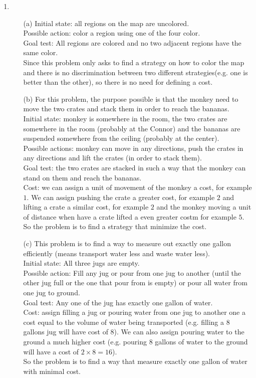 \documentclass[12pt]{article}
\begin{document}
\begin{singlespace}
\begin{enumerate}
\item
	\begin{itemize}
	\item[(a)] Initial state: all regions on the map are uncolored.\\
	Possible action: color a region using one of the four color.\\
	Goal test: All regions are colored and no two adjacent regions have the same color.\\
	Since this problem only asks to find a strategy on how to color the map and there is no discrimination between two different strategies(e.g. one is better than the other), so there is no need for defining a cost.\\
	\item[(b)] For this problem, the purpose possible is that the monkey need to move the two crates and stack them in order to reach the bananas.\\
	Initial state: monkey is somewhere in the room, the two crates are somewhere in the room (probably at the Connor) and the bananas are suspended somewhere from the ceiling (probably at the center).\\
	Possible actions: monkey can move in any directions, push the crates in any directions and lift the crates (in order to stack them).\\
	Goal test: the two crates are stacked in such a way that the monkey can stand on them and reach the bananas.\\
	Cost: we can assign a unit of movement of the monkey a cost, for example $1$. We can assign pushing the crate a greater cost, for example $2$ and lifting a crate a similar cost, for example $2$ and the monkey moving a unit of distance when have a crate lifted a even greater costm for example $5$.\\
	So the problem is to find a strategy that minimize the cost.
	\item[(c)] This problem is to find a way to measure out exactly one gallon efficiently (means transport water less and waste water less).\\
	Initial state: All three jugs are empty.\\
	Possible action: Fill any jug or pour from one jug to another (until the other jug full or the one that pour from is empty) or pour all water from one jug to ground.\\
	Goal test: Any one of the jug has exactly one gallon of water.\\
	Cost: assign filling a jug or pouring water from one jug to another one a cost equal to the volume of water being transported (e.g. filling a 8 gallons jug will have cost of 8). We can also assign pouring water to the ground a much higher cost (e.g. pouring 8 gallons of water to the ground will have a cost of $2\times8=16$).\\
	So the problem is to find a way that measure exactly one gallon of water with minimal cost.
	\end{itemize}
\end{enumerate}
\end{singlespace}

\clearpage

\printbibliography
\end{document}

